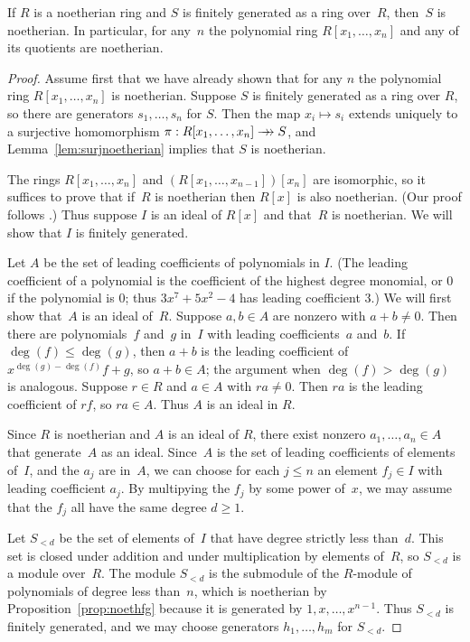 \begin{theorem}\label{thm:hilbert}
If $R$ is a noetherian ring and $S$ is finitely generated as a ring
over~$R$, then~$S$ is noetherian.  In particular, for any~$n$ the
polynomial ring $R[x_1,\ldots, x_n]$ and any of its quotients are
noetherian.
\end{theorem}
\begin{proof}
Assume first that we have already shown that for any $n$ the
polynomial ring $R[x_1,\ldots, x_n]$ is noetherian.  Suppose $S$ is
finitely generated as a ring over $R$, so there are generators
$s_1,\ldots, s_n$ for $S$.  Then the map $x_i\mapsto s_i$ extends
uniquely to a surjective homomorphism $\pi: R[x_1,\ldots, x_n] \rightarrow\!\!\!\!\rightarrow S$,
and Lemma~\ref{lem:surjnoetherian} implies that $S$ is noetherian.

The rings $R[x_1,\ldots, x_n]$ and $(R[x_1,\ldots,x_{n-1}])[x_n]$ are
isomorphic, so it suffices to prove that if~$R$ is noetherian then
$R[x]$ is also noetherian.  (Our proof follows
\cite[\S12.5]{artin:algebra}.)
Thus suppose $I$ is an ideal of $R[x]$ and that~$R$ is
noetherian.  We will show that $I$ is finitely generated.

Let $A$ be the set of leading coefficients of polynomials in $I$.  
(The leading coefficient of a polynomial is the coefficient of
the highest degree monomial, or $0$ if the polynomial is $0$; thus 
$3x^7 + 5x^2  - 4$ has leading coefficient $3$.)
We will first show that~$A$ is an ideal of~$R$.
Suppose $a,b\in A$ are nonzero with $a+b\neq 0$.  Then there are
polynomials~$f$ and~$g$ in~$I$ with leading coefficients~$a$ and~$b$.
If $\deg(f)\leq \deg(g)$, then $a+b$ is the leading coefficient of
$x^{\deg(g)-\deg(f)}f + g$, so $a+b\in A$; the argument when 
$\deg(f)> \deg(g)$ is analogous.  Suppose $r\in R$ and $a\in A$
with $ra\neq 0$. Then $ra$ is the leading coefficient of $rf$, so
$ra\in A$.  Thus $A$ is an ideal in $R$. 

Since $R$ is noetherian and $A$ is an ideal of $R$, there exist nonzero
$a_1,\ldots, a_n\in A$ that generate~$A$ as an ideal.  Since~$A$ is the set
of leading coefficients of elements of~$I$, and the $a_j$ are in~$A$,
we can choose for each $j\leq n$ an element $f_j\in I$ with leading
coefficient $a_j$.  By multipying the $f_j$ by some power of~$x$, we
may assume that the $f_j$ all have the same degree $d\geq 1$.

Let $S_{<d}$ be the set of elements of~$I$ that have degree strictly
less than~$d$.  This set is closed under addition and under
multiplication by elements of~$R$, so $S_{<d}$ is a module over~$R$.
The module $S_{<d}$ is the submodule of the $R$-module of polynomials
of degree less than~$n$, which is noetherian by
Proposition~\ref{prop:noethfg} because it is generated by $1,x,\ldots,
x^{n-1}$.  Thus $S_{<d}$ is finitely generated, and we may choose
generators $h_1,\ldots, h_m$ for $S_{<d}$.


\end{proof}
